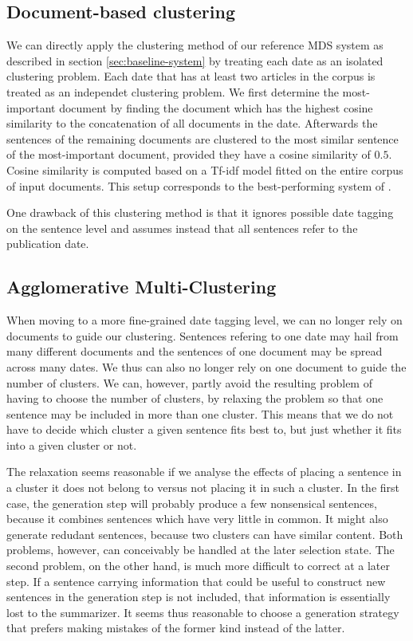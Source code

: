 \documentclass[a4paper,BCOR=10mm]{report}
\begin{document}
\subsection{Document-based clustering}

We can directly apply the clustering method of our reference MDS system as described in section \ref{sec:baseline-system} by treating each date as an isolated clustering problem.
Each date that has at least two articles in the corpus is treated as an independet clustering problem.
We first determine the most-important document by finding the document which has the highest cosine similarity to the concatenation of all documents in the date.
Afterwards the sentences of the remaining documents are clustered to the most similar sentence of the most-important document, provided they have a cosine similarity of $0.5$. Cosine similarity is computed based on a Tf-idf model fitted on the entire corpus of input documents.
This setup corresponds to the best-performing system of \citet{banerjee}.

One drawback of this clustering method is that it ignores possible date tagging on the sentence level and assumes instead that all sentences refer to the publication date. 

\subsection{Agglomerative Multi-Clustering}

When moving to a more fine-grained date tagging level, we can no longer rely on documents to guide our clustering. Sentences refering to one date may hail from many different documents and the sentences of one document may be spread across many dates.
We thus can also no longer rely on one document to guide the number of clusters. We can, however, partly avoid the resulting problem of having to choose the number of clusters, by relaxing the problem so that one sentence may be included in more than one cluster.
This means that we do not have to decide which cluster a given sentence fits best to, but just whether it fits into a given cluster or not.

The relaxation seems reasonable if we analyse the effects of placing a sentence in a cluster it does not belong to versus not placing it in such a cluster.
In the first case, the generation step will probably produce a few nonsensical sentences, because it combines sentences which have very little in common.
It might also generate redudant sentences, because two clusters can have similar content. Both problems, however, can conceivably be handled at the later selection state.
The second problem, on the other hand, is much more difficult to correct at a later step. If a sentence carrying information that could be useful to construct new sentences in the generation step is not included, that information is essentially lost to the summarizer. It seems thus reasonable to choose a generation strategy that prefers making mistakes of the former kind instead of the latter.
\end{document}
